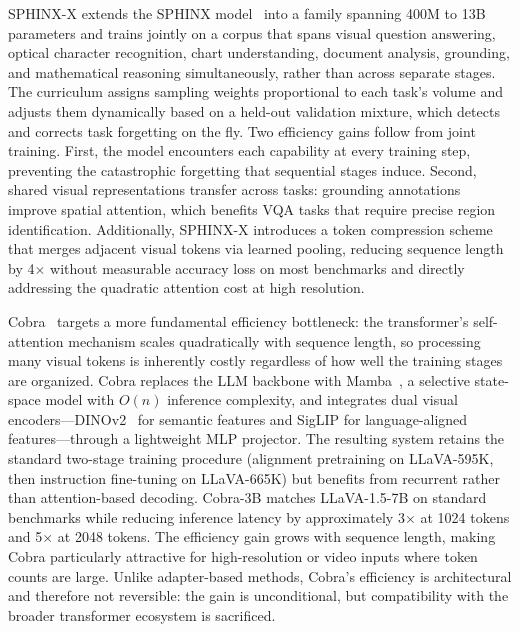SPHINX-X extends the SPHINX model~\cite{Lin202310250} into a family spanning 400M to 13B parameters and trains jointly on a corpus that spans visual question answering, optical character recognition, chart understanding, document analysis, grounding, and mathematical reasoning simultaneously, rather than across separate stages. The curriculum assigns sampling weights proportional to each task's volume and adjusts them dynamically based on a held-out validation mixture, which detects and corrects task forgetting on the fly. Two efficiency gains follow from joint training. First, the model encounters each capability at every training step, preventing the catastrophic forgetting that sequential stages induce. Second, shared visual representations transfer across tasks: grounding annotations improve spatial attention, which benefits VQA tasks that require precise region identification. Additionally, SPHINX-X introduces a token compression scheme that merges adjacent visual tokens via learned pooling, reducing sequence length by 4$\times$ without measurable accuracy loss on most benchmarks and directly addressing the quadratic attention cost at high resolution.

Cobra~\cite{Zhao202403520} targets a more fundamental efficiency bottleneck: the transformer's self-attention mechanism scales quadratically with sequence length, so processing many visual tokens is inherently costly regardless of how well the training stages are organized. Cobra replaces the LLM backbone with Mamba~\cite{Gu202312110}, a selective state-space model with $O(n)$ inference complexity, and integrates dual visual encoders---DINOv2~\cite{Oquab202309896} for semantic features and SigLIP for language-aligned features---through a lightweight MLP projector. The resulting system retains the standard two-stage training procedure (alignment pretraining on LLaVA-595K, then instruction fine-tuning on LLaVA-665K) but benefits from recurrent rather than attention-based decoding. Cobra-3B matches LLaVA-1.5-7B on standard benchmarks while reducing inference latency by approximately 3$\times$ at 1024 tokens and 5$\times$ at 2048 tokens. The efficiency gain grows with sequence length, making Cobra particularly attractive for high-resolution or video inputs where token counts are large. Unlike adapter-based methods, Cobra's efficiency is architectural and therefore not reversible: the gain is unconditional, but compatibility with the broader transformer ecosystem is sacrificed.

